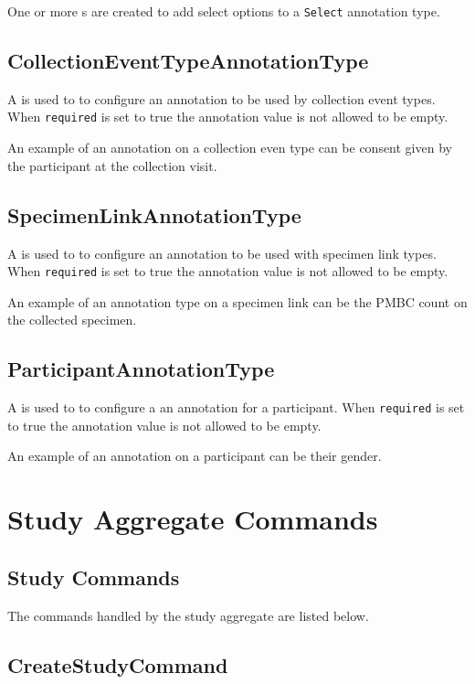 One or more s are created to add select options to
a \texttt{Select} annotation type.

\subsection*{CollectionEventTypeAnnotationType}

A  is used to to configure an
annotation to be used by collection event types. When \texttt{required} is set
to true the annotation value is not allowed to be empty.

An example of an annotation on a collection even type can be consent given by
the participant at the collection visit.

\subsection*{SpecimenLinkAnnotationType}

A  is used to to configure an
annotation to be used with specimen link types. When \texttt{required} is set
to true the annotation value is not allowed to be empty.

An example of an annotation type on a specimen link can be the PMBC count on
the collected specimen.

\subsection*{ParticipantAnnotationType}

A  is used to to configure a an
annotation for a participant. When \texttt{required} is set to true the
annotation value is not allowed to be empty.

An example of an annotation on a participant can be their gender.

\section {Study Aggregate Commands}

\subsection{Study Commands}
The commands handled by the study aggregate are listed below.

\subsection*{CreateStudyCommand}

